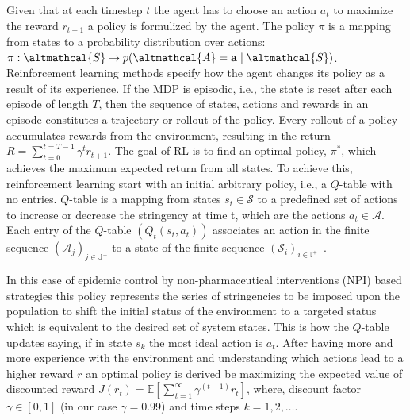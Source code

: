 \documentclass[tikz,fleqn,12pt]{wlscirep}
\begin{document}
Given that at each timestep $t$ the agent has to choose an action $a_t$ to maximize the reward $r_{t+1}$ a policy is formulized by the agent. The policy $\pi$ is a mapping from states to a probability distribution over actions: $\pi: \altmathcal{S} \rightarrow p(\altmathcal{A}=\mathbf{a} \mid \altmathcal{S})$. Reinforcement learning methods specify how the agent changes its policy as a result of its experience. If the MDP is episodic, i.e., the state is reset after each episode of length $T$, then the sequence of states, actions and rewards in an episode constitutes a trajectory or rollout of the policy. Every rollout of a policy accumulates rewards from the environment, resulting in the return $R=\sum_{t=0}^{t=T-1} \gamma^t r_{t+1}$. The goal of RL is to find an optimal policy, $\pi^*$, which achieves the maximum expected return from all states. To achieve this, reinforcement learning start with an initial arbitrary policy, i.e., a $Q$-table with no entries. $Q$-table is a mapping from states $s_t \in \mathscr{S}$ to a predefined set of actions to increase or decrease the stringency at time t, which are the actions $a_t \in \mathscr{A}$. Each entry of the $Q$-table $\left(Q_t\left(s_t, a_t\right)\right)$ associates an action in the finite sequence $\left(\mathscr{A}_j\right)_{j \in \mathbb{J}^{+}}$ to a state of the finite sequence $\left(\mathscr{S}_i\right)_{i \in \mathbb{I}^{+}}$~\cite{sutton2018reinforcement}. 

In this case of epidemic control by non-pharmaceutical interventions (NPI) based strategies this policy represents the series of stringencies to be imposed upon the population to shift the initial status of the environment to a targeted status which is equivalent to the desired set of system states. This is how the $Q$-table updates saying, if in state $s_k$ the most ideal action is $a_t$. After having more and more experience with the environment and understanding which actions lead to a higher reward $r$ an optimal policy is derived be maximizing the expected value of discounted reward $J\left(r_t\right)=\mathbb{E}\left[\sum_{t=1}^{\infty} \gamma^{(t-1)} r_t\right]$, where, discount factor $\gamma \in [0, 1]$ (in our case $\gamma = 0.99$) and time steps $k = 1, 2, \dots$.
\end{document}
